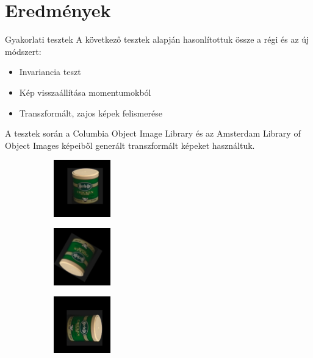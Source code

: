 \documentclass{beamer}
\begin{document}
\section{Eredmények}
\begin{frame}{Gyakorlati tesztek}
    \vskip 5mm
    A következő tesztek alapján hasonlítottuk össze a régi és az új módszert:
    \begin{itemize}
    \item Invariancia teszt
    \item Kép visszaállítása momentumokból
    \item Transzformált, zajos képek felismerése
    \end{itemize}
    A tesztek során a Columbia Object Image Library és az Amsterdam Library of Object Images képeiből generált transzformált képeket használtuk.
    \begin{figure}[tbp]
        \begin{subfigure}{0.3\textwidth}
            \centering
        \includegraphics[width=70pt]{figures/coil_rst/26x-11y9r0s1_0.png}
        \end{subfigure}
        \begin{subfigure}{0.3\textwidth}
            \centering
        \includegraphics[width=70pt]{figures/coil_rst/26x-11y9r150s0_5.png}
        \end{subfigure}
        \begin{subfigure}{0.3\textwidth}
            \centering
        \includegraphics[width=70pt]{figures/coil_rst/26x-11y9r270s1_75.png}
        \end{subfigure}
    \end{figure}
\end{frame}
\end{document}
